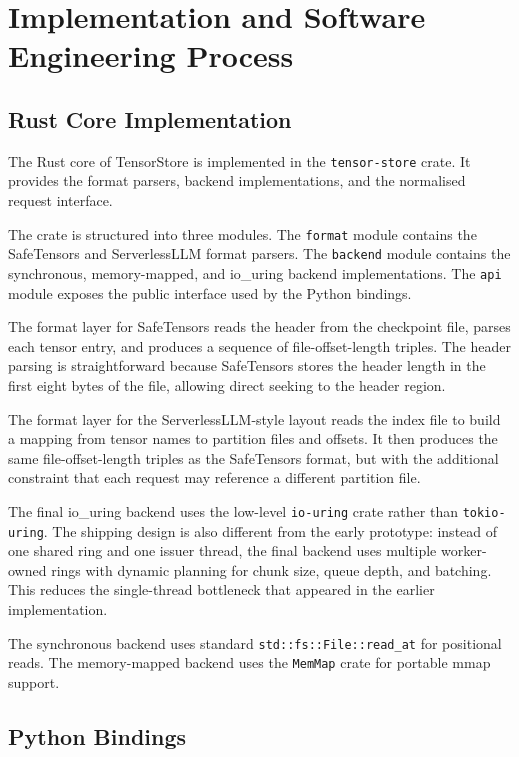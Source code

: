 \chapter{Implementation and Software Engineering Process}
\label{chap:implementation}

\section{Rust Core Implementation}

The Rust core of TensorStore is implemented in the \texttt{tensor-store} crate. It provides the format parsers, backend implementations, and the normalised request interface.

The crate is structured into three modules. The \texttt{format} module contains the SafeTensors and ServerlessLLM format parsers. The \texttt{backend} module contains the synchronous, memory-mapped, and io\_uring backend implementations. The \texttt{api} module exposes the public interface used by the Python bindings.

The format layer for SafeTensors reads the header from the checkpoint file, parses each tensor entry, and produces a sequence of file-offset-length triples. The header parsing is straightforward because SafeTensors stores the header length in the first eight bytes of the file, allowing direct seeking to the header region.

The format layer for the ServerlessLLM-style layout reads the index file to build a mapping from tensor names to partition files and offsets. It then produces the same file-offset-length triples as the SafeTensors format, but with the additional constraint that each request may reference a different partition file.

The final io\_uring backend uses the low-level \texttt{io-uring} crate rather than \texttt{tokio-uring}. The shipping design is also different from the early prototype: instead of one shared ring and one issuer thread, the final backend uses multiple worker-owned rings with dynamic planning for chunk size, queue depth, and batching. This reduces the single-thread bottleneck that appeared in the earlier implementation.

The synchronous backend uses standard \texttt{std::fs::File::read\_at} for positional reads. The memory-mapped backend uses the \texttt{MemMap} crate for portable mmap support.

\section{Python Bindings}

